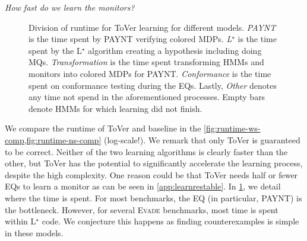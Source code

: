 \documentclass[runningheads]{llncs}
\newcommand{\appcite}[2]{#2} %
\renewcommand{\paragraph}[1]{\smallskip\noindent\emph{#1}}
\newcommand{\alg}{ToVer\xspace}
\begin{document}
\paragraph{How fast do we learn the monitors?}
\begin{figure}[t]
    \resizebox{\linewidth}{!}{
        }
    \caption{Division of runtime for \alg learning for different models.
        \emph{PAYNT} is the time spent by PAYNT verifying colored MDPs. \emph{L$^\star$} is the time spent by the L$^\star$ algorithm creating a hypothesis including doing MQs. \emph{Transformation} is the time spent transforming HMMs and monitors into colored MDPs for PAYNT. \emph{Conformance} is the time spent on conformance testing during the EQs. Lastly, \emph{Other} denotes any time not spend in the aforementioned processes.
        Empty bars denote HMMs for which learning did not finish.}
    \label{fig:runtimediv}
\end{figure}
We compare the runtime of \alg and baseline in the \cref{fig:runtime-ws-comp,fig:runtime-ns-comp} (log-scale!).
We remark that only \alg{} is guaranteed to be correct. Neither of the two learning algorithms is clearly faster than the other, but \alg{} has the potential to significantly accelerate the learning process, despite the high complexity. One reason could be that \alg needs half or fewer EQs to learn a monitor as can be seen in \appcite{\cite[App. E.2]{TR}}{\cref{app:learnrestable}}. In \cref{fig:runtimediv}, we detail where the time is spent. For most benchmarks, the EQ (in particular, PAYNT) is the bottleneck. However, for several \textsc{Evade} benchmarks, most time is spent within L$^\star$ code. We conjecture this happens as finding counterexamples is simple in these models.

\end{document}
